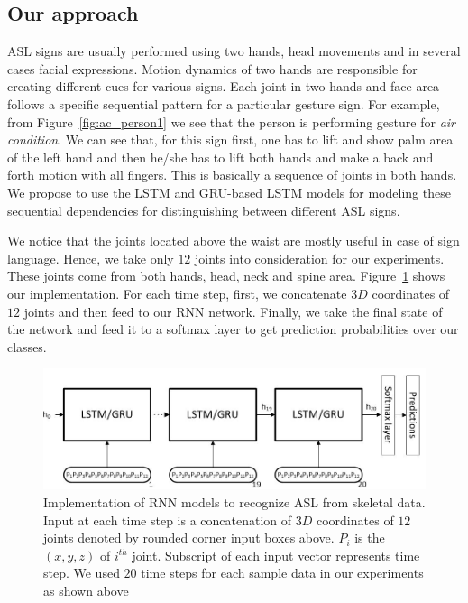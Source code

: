 \documentclass[10pt,twocolumn,letterpaper]{article}
\begin{document}
\subsection{Our approach}
ASL signs are usually performed using two hands, head movements and in several  
cases facial expressions. 
Motion dynamics of 
two hands are responsible for creating different cues for various signs. Each joint in two hands and face area follows a specific sequential pattern for a particular gesture sign. For example, from Figure~\ref{fig:ac_person1} we see that 
the person is performing gesture for \textit{air condition}. We can see that, for this sign first, one has to lift and show palm area of the left hand and then he/she has to lift both hands and make a back and forth motion with all fingers. This is basically a sequence of joints in both hands. We propose to use the LSTM and GRU-based LSTM models for modeling these 
sequential dependencies for distinguishing between different ASL signs. 

We notice that the joints located above the waist are mostly useful in case of sign language. Hence, we take only $12$ joints into
consideration for  our experiments. These joints come from both hands, head, neck and spine area. Figure~\ref{fig:rnn_impl} shows our implementation. For each time step, first, we concatenate $3D$ coordinates of $12$ joints and then feed to our RNN network. Finally, we take the final state of the network and feed 
it to a softmax layer to 
get prediction probabilities over our classes.

\begin{figure}[h]
	\begin{center}
		\includegraphics[width=.8\linewidth]{rnn_impl}
	\end{center}
	\caption{Implementation of RNN models to recognize ASL from skeletal data. Input at each time step is a concatenation of $3D$ coordinates of $12$ joints denoted by rounded corner input boxes above. $P_i$ is the $(x, y, z)$ of $i^{th}$ joint. Subscript of each input vector represents time step. We used $20$ time steps for each sample data in our experiments as shown above}
	\label{fig:rnn_impl}
\end{figure}
\end{document}
